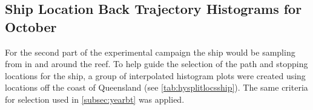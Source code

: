 \clearpage
\subsection{Ship Location Back Trajectory Histograms for October}
\label{subsec:shipoctbt}

For the second part of the experimental campaign the ship would be sampling from in and around the reef. To help guide the selection of the path and stopping locations for the ship, a group of interpolated histogram plots were created using locations off the coast of Queensland (see \cref{tab:hysplitlocsship}). The same criteria for selection used in \cref{subsec:yearbt} was applied.

